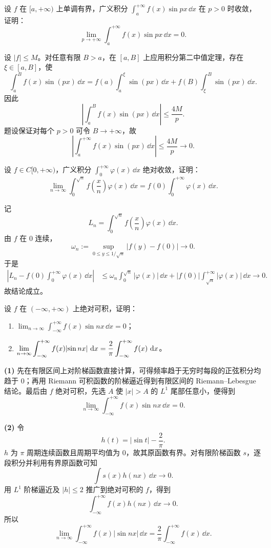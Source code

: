 \begin{xreferenceproblem}[10]
设 $f$ 在 $[a,+\infty)$ 上单调有界，广义积分 $\int_a^{+\infty}f(x)\sin px\,\dd x$ 在 $p>0$ 时收敛，证明：
  \[
    \lim_{p\to+\infty}\int_a^{+\infty}f(x)\sin px\,\dd x=0.
  \]
\end{xreferenceproblem}
\begin{xsolution}
设 $|f|\leq M$。对任意有限 $B>a$，在 $[a,B]$ 上应用积分第二中值定理，存在 $\xi\in[a,B]$，使
\[
  \int_a^B f(x)\sin(px)\,\dd x
  =f(a)\int_a^\xi\sin(px)\,\dd x
   +f(B)\int_\xi^B\sin(px)\,\dd x.
\]
因此
\[
  \left|\int_a^B f(x)\sin(px)\,\dd x\right|
  \leq\frac{4M}{p}.
\]
题设保证对每个 $p>0$ 可令 $B\to+\infty$，故
\[
  \left|\int_a^{+\infty}f(x)\sin(px)\,\dd x\right|\leq\frac{4M}{p}\to0.
\]
\end{xsolution}


\begin{xreferenceproblem}[11]
设 $f\in C[0,+\infty)$，广义积分 $\int_0^{+\infty}\varphi(x)\,\dd x$ 绝对收敛，证明：
  \[
    \lim_{n\to\infty}\int_0^{\sqrt n}f\left(\frac xn\right)\varphi(x)\,\dd x
    =f(0)\int_0^{+\infty}\varphi(x)\,\dd x.
  \]
\end{xreferenceproblem}
\begin{xsolution}
记
\[
  L_n=\int_0^{\sqrt n}f\left(\frac xn\right)\varphi(x)\,\dd x.
\]
由 $f$ 在 $0$ 连续，
\[
  \omega_n:=\sup_{0\leq y\leq1/\sqrt n}|f(y)-f(0)|\to0.
\]
于是
\begin{align*}
  \left|L_n-f(0)\int_0^{+\infty}\varphi(x)\,\dd x\right|
  &\leq \omega_n\int_0^{\sqrt n}|\varphi(x)|\,\dd x
  +|f(0)|\int_{\sqrt n}^{+\infty}|\varphi(x)|\,\dd x\to0.
\end{align*}
故结论成立。
\end{xsolution}


\begin{xreferenceproblem}[12]
设 $f$ 在 $(-\infty,+\infty)$ 上绝对可积，证明：
  \begin{enumerate}[label=(\arabic*)]
    \item $\displaystyle\lim_{n\to\infty}\int_{-\infty}^{+\infty}f(x)\sin nx\,\dd x=0$；
    \item $\displaystyle\lim_{n\to\infty}\int_{-\infty}^{+\infty}f(x)\lvert\sin nx\rvert\,\mathop{}\!\mathrm{d} x=\frac2\pi\int_{-\infty}^{+\infty}f(x)\,\mathop{}\!\mathrm{d} x$。
  \end{enumerate}
\end{xreferenceproblem}
\begin{xsolution}
\textbf{(1)} 先在有限区间上对阶梯函数直接计算，可得频率趋于无穷时每段的正弦积分均趋于 $0$；再用 Riemann 可积函数的阶梯逼近得到有限区间的 Riemann--Lebesgue 结论。最后由 $f$ 绝对可积，先选 $A$ 使 $|x|>A$ 的 $L^1$ 尾部任意小，便得到
\[
  \boxed{\lim_{n\to\infty}\int_{-\infty}^{+\infty}f(x)\sin nx\,\dd x=0}.
\]

\textbf{(2)} 令
\[
  h(t)=|\sin t|-\frac2\pi.
\]
$h$ 为 $\pi$ 周期连续函数且周期平均值为 $0$，故其原函数有界。对有限阶梯函数 $s$，逐段积分并利用有界原函数可知
\[
  \int s(x)h(nx)\,\dd x\to0.
\]
用 $L^1$ 阶梯逼近及 $|h|\leq2$ 推广到绝对可积的 $f$，得到
\[
  \int_{-\infty}^{+\infty}f(x)h(nx)\,\dd x\to0.
\]
所以
\[
  \boxed{\lim_{n\to\infty}\int_{-\infty}^{+\infty}f(x)|\sin nx|\,\dd x
  =\frac2\pi\int_{-\infty}^{+\infty}f(x)\,\dd x}.
\]
\end{xsolution}


